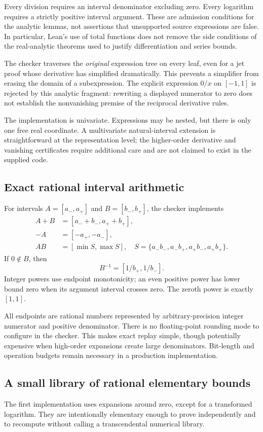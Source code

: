 Every division requires an interval denominator excluding zero. Every logarithm requires a strictly positive interval argument. These are admission conditions for the analytic lemmas, not assertions that unsupported source expressions are false. In particular, Lean's use of total functions does not remove the side conditions of the real-analytic theorems used to justify differentiation and series bounds.

The checker traverses the \emph{original} expression tree on every leaf, even for a jet proof whose derivative has simplified dramatically. This prevents a simplifier from erasing the domain of a subexpression. The explicit expression \(0/x\) on \([-1,1]\) is rejected by this analytic fragment: rewriting a displayed numerator to zero does not establish the nonvanishing premise of the reciprocal derivative rules.

The implementation is univariate. Expressions may be nested, but there is only one free real coordinate. A multivariate natural-interval extension is straightforward at the representation level; the higher-order derivative and vanishing certificates require additional care and are not claimed to exist in the supplied code.

\subsection{Exact rational interval arithmetic}
For intervals \(A=[a_-,a_+]\) and \(B=[b_-,b_+]\), the checker implements
\begin{align*}
 A+B&=[a_-+b_-,a_++b_+],\\
 -A&=[-a_+,-a_-],\\
 AB&=[\min S,\max S],
 \quad S=\{a_-b_-,a_-b_+,a_+b_-,a_+b_+\}.
\end{align*}
If \(0\notin B\), then
\[
 B^{-1}=[1/b_+,1/b_-].
\]
Integer powers use endpoint monotonicity; an even positive power has lower bound zero when its argument interval crosses zero. The zeroth power is exactly \([1,1]\).

All endpoints are rational numbers represented by arbitrary-precision integer numerator and positive denominator. There is no floating-point rounding mode to configure in the checker. This makes exact replay simple, though potentially expensive when high-order expansions create large denominators. Bit-length and operation budgets remain necessary in a production implementation.

\subsection{A small library of rational elementary bounds}
The first implementation uses expansions around zero, except for a transformed logarithm. They are intentionally elementary enough to prove independently and to recompute without calling a transcendental numerical library.

